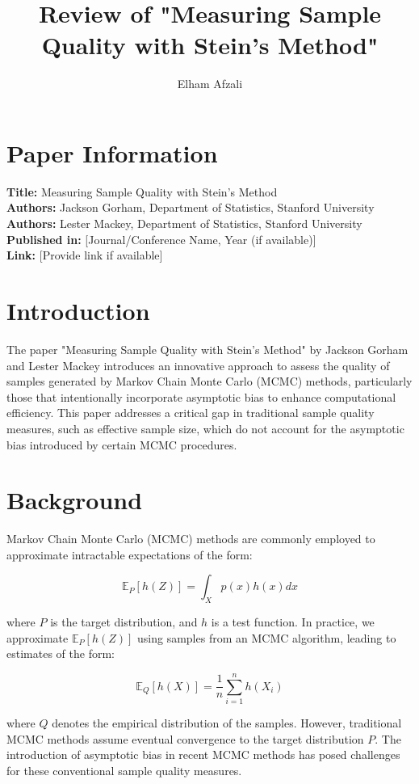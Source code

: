 \documentclass{article}
\title{Review of "Measuring Sample Quality with Stein’s Method"}
\author{Elham Afzali}
\begin{document}
	
	\maketitle
	
	\section*{Paper Information}
	\textbf{Title:} Measuring Sample Quality with Stein’s Method \\
	\textbf{Authors:} Jackson Gorham, Department of Statistics, Stanford University \\
	\textbf{Authors:} Lester Mackey, Department of Statistics, Stanford University \\
	\textbf{Published in:} [Journal/Conference Name, Year (if available)] \\
	\textbf{Link:} [Provide link if available]
	
	\section*{Introduction}
	The paper "Measuring Sample Quality with Stein’s Method" by Jackson Gorham and Lester Mackey introduces an innovative approach to assess the quality of samples generated by Markov Chain Monte Carlo (MCMC) methods, particularly those that intentionally incorporate asymptotic bias to enhance computational efficiency. This paper addresses a critical gap in traditional sample quality measures, such as effective sample size, which do not account for the asymptotic bias introduced by certain MCMC procedures.
	
	\section*{Background}
	Markov Chain Monte Carlo (MCMC) methods are commonly employed to approximate intractable expectations of the form:
	
	\[
	\mathbb{E}_P[h(Z)] = \int_X p(x)h(x)dx
	\]
	
	where \(P\) is the target distribution, and \(h\) is a test function. In practice, we approximate \(\mathbb{E}_P[h(Z)]\) using samples from an MCMC algorithm, leading to estimates of the form:
	
	\[
	\mathbb{E}_Q[h(X)] = \frac{1}{n} \sum_{i=1}^n h(X_i)
	\]
	
	where \(Q\) denotes the empirical distribution of the samples. However, traditional MCMC methods assume eventual convergence to the target distribution \(P\). The introduction of asymptotic bias in recent MCMC methods has posed challenges for these conventional sample quality measures.
	
\end{document}
